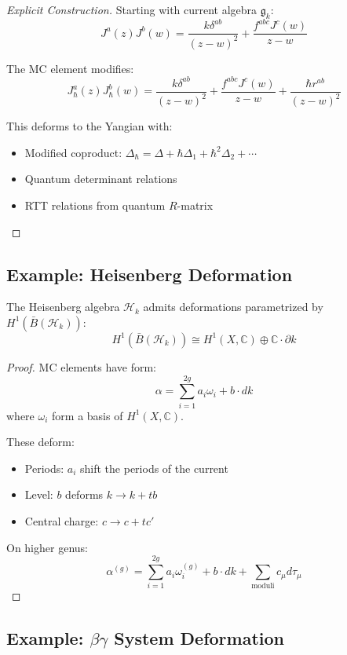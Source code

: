 \begin{proof}[Explicit Construction]
Starting with current algebra $\mathfrak{g}_k$:
$$J^a(z)J^b(w) = \frac{k\delta^{ab}}{(z-w)^2} + \frac{f^{abc}J^c(w)}{z-w}$$

The MC element modifies:
$$J^a_\hbar(z)J^b_\hbar(w) = \frac{k\delta^{ab}}{(z-w)^2} + \frac{f^{abc}J^c(w)}{z-w} + \frac{\hbar r^{ab}}{(z-w)^2}$$

This deforms to the Yangian with:
\begin{itemize}
\item Modified coproduct: $\Delta_\hbar = \Delta + \hbar \Delta_1 + \hbar^2 \Delta_2 + \cdots$
\item Quantum determinant relations
\item RTT relations from quantum $R$-matrix
\end{itemize}
\end{proof}

\subsection{Example: Heisenberg Deformation}

\begin{theorem}
The Heisenberg algebra $\mathcal{H}_k$ admits deformations parametrized by $H^1(\bar{B}(\mathcal{H}_k))$:
$$H^1(\bar{B}(\mathcal{H}_k)) \cong H^1(X, \mathbb{C}) \oplus \mathbb{C} \cdot \partial k$$
\end{theorem}

\begin{proof}
MC elements have form:
$$\alpha = \sum_{i=1}^{2g} a_i \omega_i + b \cdot dk$$
where $\omega_i$ form a basis of $H^1(X, \mathbb{C})$.

These deform:
\begin{itemize}
\item Periods: $a_i$ shift the periods of the current
\item Level: $b$ deforms $k \to k + tb$
\item Central charge: $c \to c + tc'$
\end{itemize}

On higher genus:
$$\alpha^{(g)} = \sum_{i=1}^{2g} a_i \omega_i^{(g)} + b \cdot dk + \sum_{\text{moduli}} c_\mu d\tau_\mu$$
\end{proof}

\subsection{Example: $\beta\gamma$ System Deformation}

